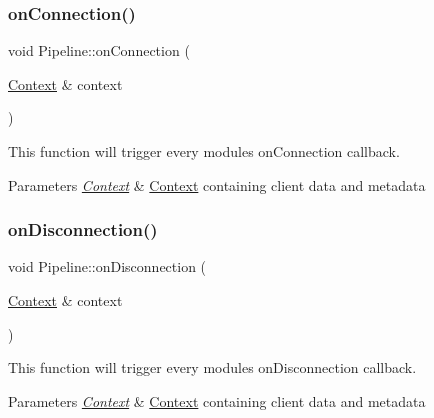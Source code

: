 \subsubsection{\texorpdfstring{onConnection()}{onConnection()}}
{\footnotesize\ttfamily void Pipeline\+::on\+Connection (\begin{DoxyParamCaption}\item[{\mbox{\hyperlink{classo_z_1_1_context}{Context}} \&}]{context }\end{DoxyParamCaption})\hspace{0.3cm}{\ttfamily [virtual]}}



This function will trigger every module\textquotesingle{}s \textquotesingle{}on\+Connection\textquotesingle{} callback. 


\begin{DoxyParams}{Parameters}
{\em \mbox{\hyperlink{classo_z_1_1_context}{Context}}} & \mbox{\hyperlink{classo_z_1_1_context}{Context}} containing client data and metadata \\
\hline
\end{DoxyParams}
\mbox{\label{classo_z_1_1_pipeline_a4245ad0f1fb310cf19986dbaf0bff3d2}} 
\subsubsection{\texorpdfstring{onDisconnection()}{onDisconnection()}}
{\footnotesize\ttfamily void Pipeline\+::on\+Disconnection (\begin{DoxyParamCaption}\item[{\mbox{\hyperlink{classo_z_1_1_context}{Context}} \&}]{context }\end{DoxyParamCaption})\hspace{0.3cm}{\ttfamily [virtual]}}



This function will trigger every module\textquotesingle{}s \textquotesingle{}on\+Disconnection\textquotesingle{} callback. 


\begin{DoxyParams}{Parameters}
{\em \mbox{\hyperlink{classo_z_1_1_context}{Context}}} & \mbox{\hyperlink{classo_z_1_1_context}{Context}} containing client data and metadata \\
\hline
\end{DoxyParams}
\mbox{\label{classo_z_1_1_pipeline_a0265d90a5540e69b25069d5d96973c53}} 
